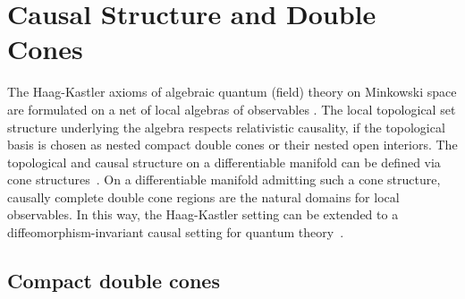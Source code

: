 \documentclass[11pt,a4paper]{article}
\theoremstyle{definition}
\begin{document}
	\section{Causal Structure and Double Cones}
	The Haag-Kastler axioms of algebraic quantum (field) theory on Minkowski space are formulated on a net of local algebras of observables \cite{haag1992}. The local topological set structure underlying the algebra respects relativistic causality, if the topological basis is chosen as nested compact double cones or their nested open interiors. 
	The topological and causal structure on a differentiable manifold can be defined via cone structures~\cite{rainer1999cones}. On a differentiable manifold admitting such a cone structure, causally complete double cone regions are the natural domains for local observables. In this way, the Haag-Kastler setting can be extended to a diffeomorphism-invariant causal setting for quantum theory~\cite{rainer2000haag}.
	
	\subsection{Compact double cones}
	
\end{document}
